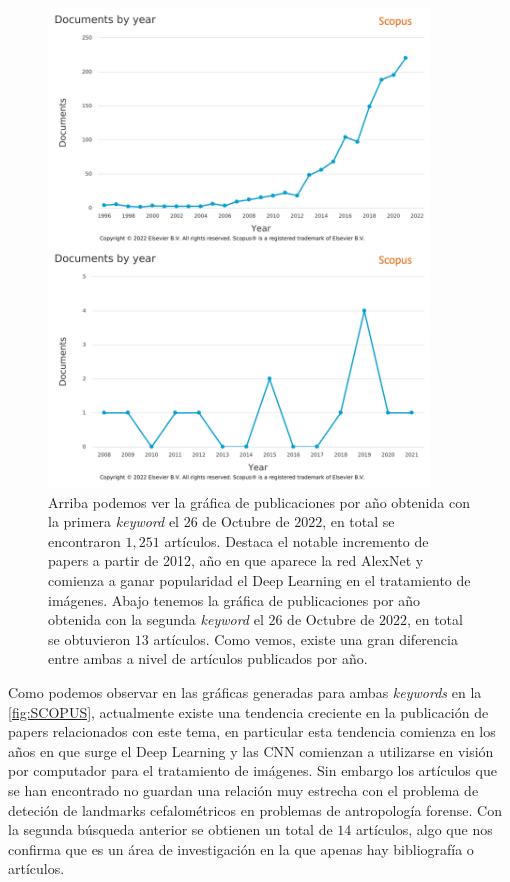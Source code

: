         \begin{figure}[htpb]
            \centering
            \includegraphics[width=0.9\textwidth]{img/SCOPUS_UNIDOS.png}
            \caption{Arriba podemos ver la gráfica de publicaciones por año obtenida con la primera \textit{keyword} el $26$ de Octubre de $2022$, en total se encontraron $1,251$ artículos. Destaca el notable incremento de papers a partir de 2012, año en que aparece la red AlexNet y comienza a ganar popularidad el Deep Learning en el tratamiento de imágenes. Abajo tenemos la gráfica de publicaciones por año obtenida con la segunda \textit{keyword} el $26$ de Octubre de $2022$, en total se obtuvieron $13$ artículos. Como vemos, existe una gran diferencia entre ambas a nivel de artículos publicados por año.}
            \label{fig:SCOPUS}
        \end{figure}
        
        \medskip
        
        \noindent Como podemos observar en las gráficas generadas para ambas \textit{keywords} en la \autoref{fig:SCOPUS}, actualmente existe una tendencia creciente en la publicación de papers relacionados con este tema, en particular esta tendencia comienza en los años en que surge el Deep Learning y las CNN comienzan a utilizarse en visión por computador para el tratamiento de imágenes. Sin embargo los artículos que se han encontrado no guardan una relación muy estrecha con el problema de deteción de landmarks cefalométricos en problemas de antropología forense. Con la segunda búsqueda anterior se obtienen un total de $14$ artículos, algo que nos confirma que es un área de investigación en la que apenas hay bibliografía o artículos.

